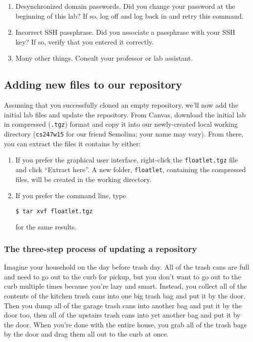\documentclass[12pt]{article}
\begin{document}
	\begin{enumerate}
	\item Desynchronized domain passwords.  Did you change your password at the beginning of this lab?  If so, log off and log back in and retry this command.
	\item Incorrect SSH passphrase.  Did you associate a passphrase with your SSH key?  If so, verify that you entered it correctly.
	\item Many other things.  Consult your professor or lab assistant.
	\end{enumerate}

\subsection{Adding new files to our repository}
Assuming that you successfully cloned an empty repository, we'll now add the initial lab files and update the repository.  From Canvas, download the initial lab in compressed (\verb|.tgz|) format and copy it into our newly-created local working directory (\verb|cs247w15| for our friend Semolina; your name may vary).  From there, you can extract the files it contains by either:

	\begin{enumerate}
	\item If you prefer the graphical user interface, right-click the \verb|floatlet.tgz| file and click ``Extract here''.  A new folder, \verb|floatlet|, containing the compressed files, will be created in the working directory.
	\item If you prefer the command line, type
\begin{verbatim}
$ tar xvf floatlet.tgz
\end{verbatim}
	for the same results.
	\end{enumerate}

\subsubsection{The three-step process of updating a repository}
Imagine your household on the day before trash day.  All of the trash cans are full and need to go out to the curb for pickup, but you don't want to go out to the curb multiple times because you're lazy and smart.  Instead, you collect all of the contents of the kitchen trash cans into one big trash bag and put it by the door.  Then you dump all of the garage trash cans into another bag and put it by the door too, then all of the upstairs trash cans into yet another bag and put it by the door.  When you're done with the entire house, you grab all of the trash bags by the door and drag them all out to the curb at once.
\end{document}
